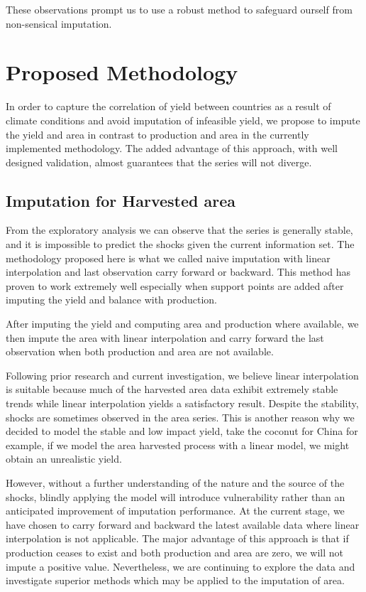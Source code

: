 \documentclass[nojss]{jss}\usepackage[]{graphicx}\usepackage[]{color}
\begin{document}
These observations prompt us to use a robust method to safeguard
ourself from non-sensical imputation.

\FloatBarrier
\section{Proposed Methodology}
In order to capture the correlation of yield between countries as a
result of climate conditions and avoid imputation of infeasible yield,
we propose to impute the yield and area in contrast to production and
area in the currently implemented methodology. The added advantage of
this approach, with well designed validation, almost guarantees that
the series will not diverge.


\subsection{Imputation for Harvested area}
From the exploratory analysis we can observe that the series is
generally stable, and it is impossible to predict the shocks given the
current information set. The methodology proposed here is what we
called naive imputation with linear interpolation and last observation
carry forward or backward. This method has proven to work extremely
well especially when support points are added after imputing the yield
and balance with production.


After imputing the yield and computing area and production where
available, we then impute the area with linear interpolation and carry
forward the last observation when both production and area are not
available.

Following prior research and current investigation, we believe linear
interpolation is suitable because much of the harvested area data
exhibit extremely stable trends while linear interpolation yields a
satisfactory result. Despite the stability, shocks are sometimes
observed in the area series.  This is another reason why we decided to
model the stable and low impact yield, take the coconut for China for
example, if we model the area harvested process with a linear model,
we might obtain an unrealistic yield.

However, without a further understanding of the nature and the source
of the shocks, blindly applying the model will introduce vulnerability
rather than an anticipated improvement of imputation performance. At
the current stage, we have chosen to carry forward and backward the
latest available data where linear interpolation is not
applicable. The major advantage of this approach is that if production
ceases to exist and both production and area are zero, we will not
impute a positive value. Nevertheless, we are continuing to explore
the data and investigate superior methods which may be applied to the
imputation of area.
\end{document}
